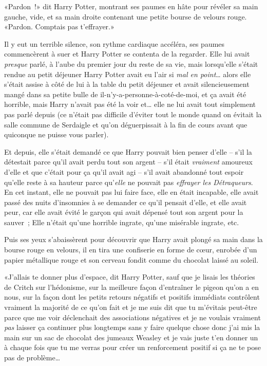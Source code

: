 «Pardon~!» dit Harry Potter, montrant ses paumes en hâte pour révéler sa main gauche, vide, et sa main droite contenant une petite bourse de velours rouge. «Pardon. Comptais pas t'effrayer.»

Il y eut un terrible silence, son rythme cardiaque accéléra, ses paumes commencèrent à suer et Harry Potter se contenta de la regarder. Elle lui avait \emph{presque} parlé, à l'aube du premier jour du reste de sa vie, mais lorsqu'elle s'était rendue au petit déjeuner Harry Potter avait eu l'air si \emph{mal en point}… alors elle s'était assise à côté de lui à la table du petit déjeuner et avait silencieusement mangé dans sa petite bulle de il-n'y-a-personne-à-coté-de-moi, et ça avait été horrible, mais Harry n'avait pas été la voir et… elle ne lui avait tout simplement pas parlé depuis (ce n'était pas difficile d'éviter tout le monde quand on évitait la salle commune de Serdaigle et qu'on déguerpissait à la fin de cours avant que quiconque ne puisse vous parler).

Et depuis, elle s'était demandé ce que Harry pouvait bien penser d'elle -- s'il la détestait parce qu'il avait perdu tout son argent -- s'il était \emph{vraiment} amoureux d'elle et que c'était pour ça qu'il avait agi -- s'il avait abandonné tout espoir qu'elle reste à sa hauteur parce qu'\emph{elle} ne pouvait pas \emph{effrayer les Détraqueurs}. En cet instant, elle ne pouvait pas lui faire face, elle en était incapable, elle avait passé des nuits d'insomnies à se demander ce qu'il pensait d'elle, et elle avait peur, car elle avait évité le garçon qui avait dépensé tout son argent pour la sauver~; Elle n'était qu'une horrible ingrate, qu'une misérable ingrate, etc.

Puis ses yeux s'abaissèrent pour découvrir que Harry avait plongé sa main dans la bourse rouge en velours, il en tira une confiserie en forme de cœur, enrobée d'un papier métallique rouge et son cerveau fondit comme du chocolat laissé au soleil.

«J'allais te donner plus d'espace, dit Harry Potter, sauf que je lisais les théories de Critch sur l'hédonisme, sur la meilleure façon d'entraîner le pigeon qu'on a en nous, sur la façon dont les petits retours négatifs et positifs immédiats contrôlent vraiment la majorité de ce qu'on fait et je me suis dit que tu m'évitais peut-être parce que me voir déclenchait des associations négatives et je ne voulais vraiment \emph{pas} laisser ça continuer plus longtemps sans y faire quelque chose donc j'ai mis la main sur un sac de chocolat des jumeaux Weasley et je vais juste t'en donner un à chaque fois que tu me verras pour créer un renforcement positif si ça ne te pose pas de problème…

